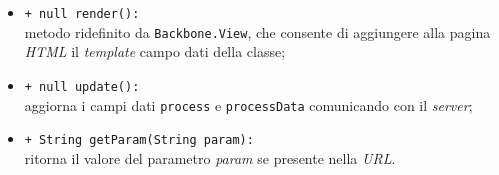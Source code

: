 \begin{flushleft}
\begin{itemize}
\begin{sloppypar}
\begin{itemize}
\item \texttt{+ null render():}\\ metodo ridefinito da \texttt{Backbone.View}, che consente di aggiungere alla pagina \textit{HTML} il \textit{template} campo dati della classe;
\item \texttt{+ null update():}\\ aggiorna i campi dati \texttt{process} e \texttt{processData} comunicando con il \textit{server};
\item \texttt{+ String getParam(String param):}\\ ritorna il valore del parametro \textit{param} se presente nella \textit{URL}.
\end{itemize}
\end{sloppypar}
\end{itemize}
\end{flushleft}

